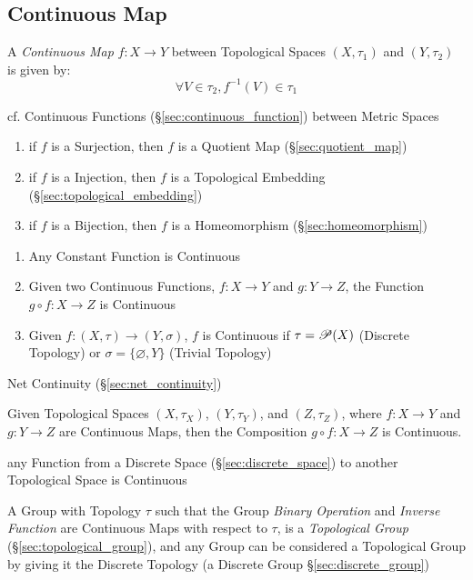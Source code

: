 \subsection{Continuous Map}\label{sec:continuous_map}

A \emph{Continuous Map} $f : X \rightarrow Y$ between Topological Spaces
$(X,\tau_1)$ and $(Y,\tau_2)$ is given by:
\[
  \forall V \in \tau_2, f^{-1}(V) \in \tau_1
\]

\fist cf. Continuous Functions (\S\ref{sec:continuous_function}) between Metric
Spaces

\begin{enumerate}
  \item if $f$ is a Surjection, then $f$ is a Quotient Map
    (\S\ref{sec:quotient_map})
  \item if $f$ is a Injection, then $f$ is a Topological Embedding
    (\S\ref{sec:topological_embedding})
  \item if $f$ is a Bijection, then $f$ is a Homeomorphism
    (\S\ref{sec:homeomorphism})
\end{enumerate}

\begin{enumerate}
  \item Any Constant Function is Continuous
  \item Given two Continuous Functions, $f : X \rightarrow Y$ and $g
    : Y \rightarrow Z$, the Function $g \circ f : X \rightarrow Z$ is
    Continuous
  \item Given $f : (X, \tau) \rightarrow (Y, \sigma)$, $f$ is
    Continuous if $\tau = \mathscr{P}(X)$ (Discrete Topology) or
    $\sigma = \{\varnothing, Y\}$ (Trivial Topology)
\end{enumerate}

Net Continuity (\S\ref{sec:net_continuity})

Given Topological Spaces $(X, \tau_X)$, $(Y, \tau_Y)$, and $(Z,
\tau_Z)$, where $f: X \rightarrow Y$ and $g: Y \rightarrow Z$ are
Continuous Maps, then the Composition $g \circ f : X \rightarrow Z$ is
Continuous.

any Function from a Discrete Space (\S\ref{sec:discrete_space}) to another
Topological Space is Continuous

A Group with Topology $\tau$ such that the Group \emph{Binary Operation} and
\emph{Inverse Function} are Continuous Maps with respect to $\tau$, is a
\emph{Topological Group} (\S\ref{sec:topological_group}), and any Group can be
considered a Topological Group by giving it the Discrete Topology (a Discrete
Group \S\ref{sec:discrete_group})



